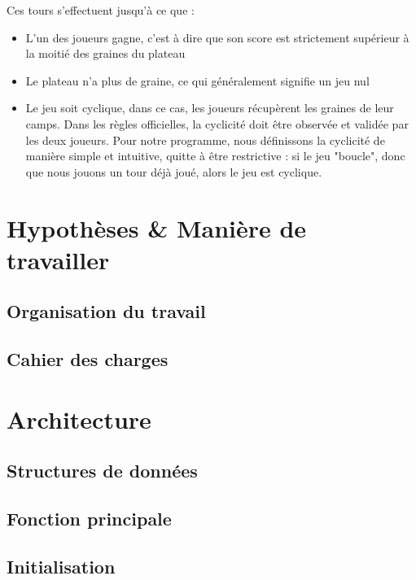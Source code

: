 \documentclass[]{article}
\begin{document}
Ces tours s'effectuent jusqu'à ce que :
\begin{itemize}
\item L'un des joueurs gagne, c'est à dire que son score est strictement supérieur à la moitié des graines du plateau
\item Le plateau n'a plus de graine, ce qui généralement signifie un jeu nul
\item Le jeu soit cyclique, dans ce cas, les joueurs récupèrent les graines de leur camps. Dans les règles officielles, la cyclicité doit être observée et validée par les deux joueurs. Pour notre programme, nous définissons la cyclicité de manière simple et intuitive, quitte à être restrictive : si le jeu "boucle", donc que nous jouons un tour déjà joué, alors le jeu est cyclique.
\end{itemize}



\section{Hypothèses \& Manière de travailler}
\subsection{Organisation du travail}

\subsection{Cahier des charges}

\section{Architecture}

\subsection{Structures de données}



\subsection{Fonction principale}



\subsection{Initialisation}
\end{document}
